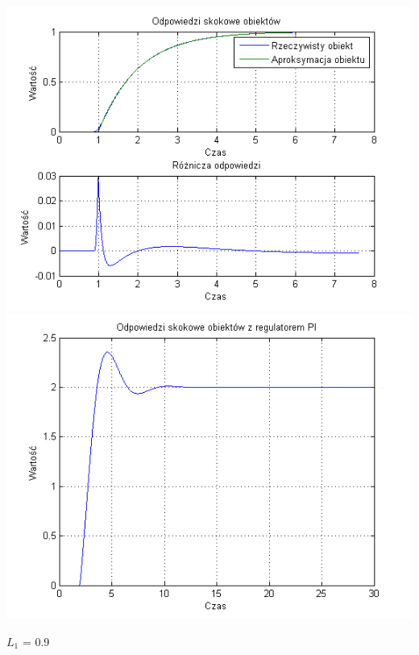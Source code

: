 \documentclass[10pt,a4paper]{article}
\begin{document}
\begin{center}
\includegraphics[scale=1]{images/jeden/skrypt_167.png}\\
\includegraphics[scale=1]{images/jeden/skrypt_168.png}\\
\end{center}
\newpage
$L_1$ = 0.9
\end{document}
